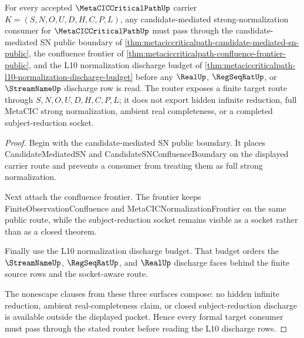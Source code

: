 \begin{theorem}
\label{thm:metaciccriticalpath-formal-target-router}
For every accepted $\MetaCICCriticalPathUp$ carrier $K=(S,N,O,U,D,H,C,P,L)$, any candidate-mediated strong-normalization consumer for $\MetaCICCriticalPathUp$ must pass through the candidate-mediated SN public boundary of \autoref{thm:metaciccriticalpath-candidate-mediated-sn-public}, the confluence frontier of \autoref{thm:metaciccriticalpath-confluence-frontier-public}, and the L10 normalization discharge budget of \autoref{thm:metaciccriticalpath-l10-normalization-discharge-budget} before any $\RealUp$, $\RegSeqRatUp$, or $\StreamNameUp$ discharge row is read. The router exposes a finite target route through $S,N,O,U,D,H,C,P,L$; it does not export hidden infinite reduction, full MetaCIC strong normalization, ambient real completeness, or a completed subject-reduction socket.
\end{theorem}
\begin{proof}
Begin with the candidate-mediated SN public boundary. It places CandidateMediatedSN and CandidateSNConfluenceBoundary on the displayed carrier route and prevents a consumer from treating them as full strong normalization.

Next attach the confluence frontier. The frontier keeps FiniteObservationConfluence and MetaCICNormalizationFrontier on the same public route, while the subject-reduction socket remains visible as a socket rather than as a closed theorem.

Finally use the L10 normalization discharge budget. That budget orders the $\StreamNameUp$, $\RegSeqRatUp$, and $\RealUp$ discharge faces behind the finite source rows and the socket-aware route.

The nonescape clauses from these three surfaces compose: no hidden infinite reduction, ambient real-completeness claim, or closed subject-reduction discharge is available outside the displayed packet. Hence every formal target consumer must pass through the stated router before reading the L10 discharge rows.
\end{proof}

